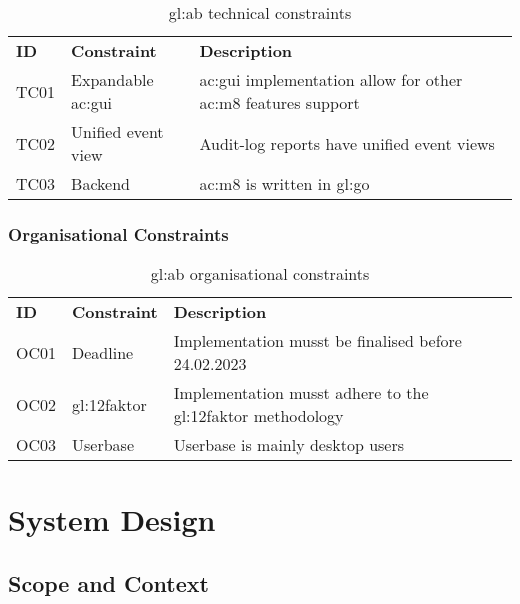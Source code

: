 \begin{table}[H]
  \begin{center}
    \label{tab:abtc}
    \def\arraystretch{1.5}
    \begin{tabularx}{\linewidth}{|l l X |}
      \hline
      \rowcolor{gray!20}
      \textbf{ID} & \textbf{Constraint} & \textbf{Description}\\
      TC01 & Expandable \gls{ac:gui} & \gls{ac:gui} implementation allow for other \gls{ac:m8} features support\\
      TC02 & Unified event view & Audit-log reports have unified event views\\
      TC03\label{tc:ab03} & Backend & \Gls{ac:m8} is written in \gls{gl:go}\\
      \hline
    \end{tabularx}
    \caption{\Gls{gl:ab} technical constraints}
  \end{center}
\end{table}

\subsubsection{Organisational Constraints}

\begin{table}[H]
  \begin{center}
    \label{tab:aboc}
    \def\arraystretch{1.5}
    \begin{tabularx}{\linewidth}{|l l X |}
      \hline
      \rowcolor{gray!20}
      \textbf{ID} & \textbf{Constraint} & \textbf{Description}\\
      OC01 & Deadline & Implementation musst be finalised before 24.02.2023\\
      OC02 & \gls{gl:12faktor} & Implementation musst adhere to the \gls{gl:12faktor} methodology\\
      OC03 & Userbase & Userbase is mainly desktop users\\
      \hline
    \end{tabularx}
  \end{center}
  \caption{\Gls{gl:ab} organisational constraints}
\end{table}

\section{System Design}

\subsection{Scope and Context}

